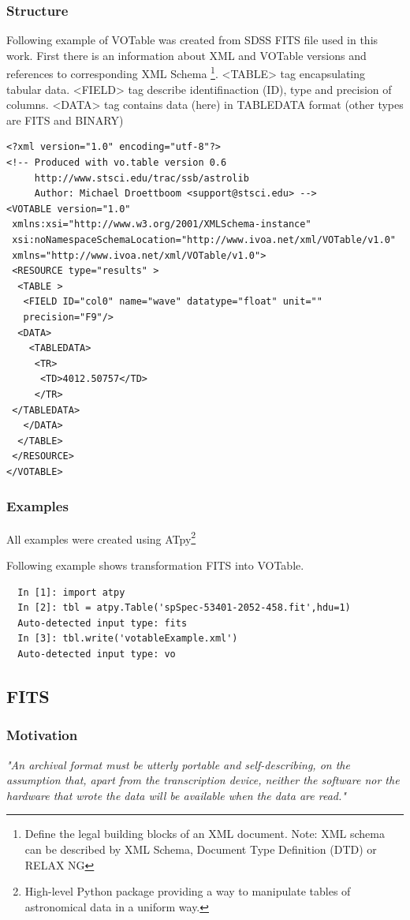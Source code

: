 \subsubsection*{Structure}
Following example of VOTable was created from SDSS FITS file used in
this work. First there is an information about XML and VOTable
versions and references to corresponding XML Schema \footnote{Define
  the legal building blocks of an XML document. Note: XML schema can
  be described by XML Schema, Document Type Definition (DTD) or RELAX
  NG }. <TABLE> tag encapsulating tabular data. <FIELD>
tag describe identifinaction (ID), type and precision of
columns. <DATA> tag contains data (here) in TABLEDATA format (other
types are FITS and BINARY)
 
\begin{lstlisting}
<?xml version="1.0" encoding="utf-8"?>
<!-- Produced with vo.table version 0.6
     http://www.stsci.edu/trac/ssb/astrolib
     Author: Michael Droettboom <support@stsci.edu> -->
<VOTABLE version="1.0"
 xmlns:xsi="http://www.w3.org/2001/XMLSchema-instance"
 xsi:noNamespaceSchemaLocation="http://www.ivoa.net/xml/VOTable/v1.0"
 xmlns="http://www.ivoa.net/xml/VOTable/v1.0">
 <RESOURCE type="results" >
  <TABLE >
   <FIELD ID="col0" name="wave" datatype="float" unit=""
   precision="F9"/>
  <DATA>
    <TABLEDATA>
     <TR>
      <TD>4012.50757</TD>
     </TR>
 </TABLEDATA>
   </DATA>
  </TABLE>
 </RESOURCE>
</VOTABLE>
\end{lstlisting}


\subsubsection*{Examples}
All examples were created using ATpy\footnote{High-level Python package
providing a way to manipulate tables of astronomical data in a uniform
way.}

Following example shows transformation FITS into VOTable. 
\begin{lstlisting}
  In [1]: import atpy
  In [2]: tbl = atpy.Table('spSpec-53401-2052-458.fit',hdu=1)
  Auto-detected input type: fits
  In [3]: tbl.write('votableExample.xml')
  Auto-detected input type: vo
\end{lstlisting}

\subsection{FITS}
\subsubsection*{Motivation}
\emph{
"An archival format must be utterly portable and self-describing, on
the assumption that, apart from the transcription device, neither the
software nor the hardware that wrote the data will be available when
the data are read." \citep{nrc1995}}


